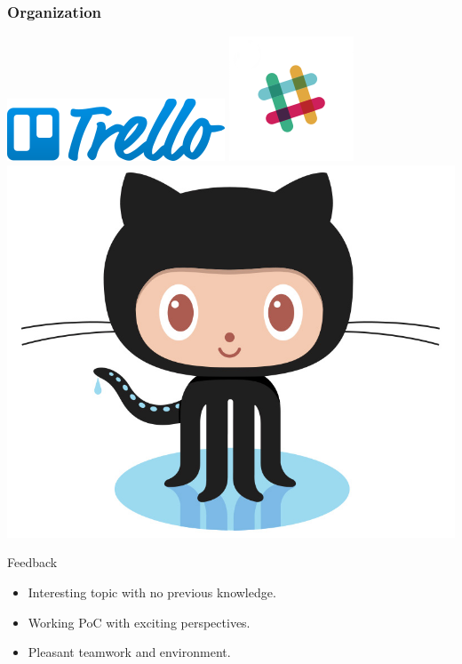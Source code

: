 \begin{frame}
	\frametitle{Organization}
	\begin{center}
	\includegraphics[scale=0.4]{figs/trello.png}
	\includegraphics[scale=0.4]{figs/slack.png}
	\includegraphics[scale=0.1]{figs/Octocat.jpg}
	\end{center}
\end{frame}


\begin{frame}{Feedback}

\begin{exampleblock}{}
\begin{itemize}

\item Interesting topic with no previous knowledge.

\item Working PoC with exciting perspectives.

\item Pleasant teamwork and environment.

\end{itemize}
\end{exampleblock}

\end{frame}
